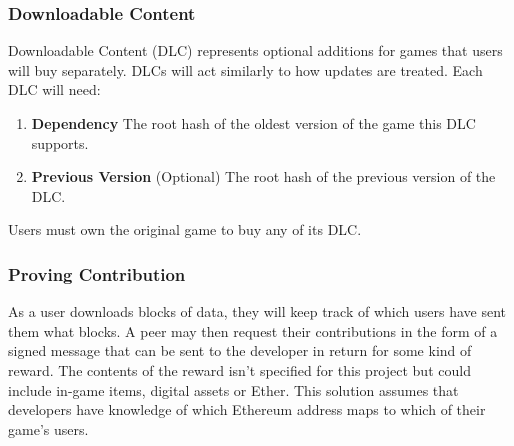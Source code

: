 \subsubsection*{Downloadable Content}

Downloadable Content (DLC)  represents optional additions for games that users will buy separately. DLCs will act similarly to how updates are treated. Each DLC will need:

\begin{enumerate}
  \item \textbf{Dependency} The root hash of the oldest version of the game this DLC supports.
  \item \textbf{Previous Version} (Optional) The root hash of the previous version of the DLC.
\end{enumerate}

\newparagraph
Users must own the original game to buy any of its DLC. 

\subsubsection*{Proving Contribution}

As a user downloads blocks of data, they will keep track of which users have sent them what blocks. A peer may then request their contributions in the form of a signed message that can be sent to the developer  in return for some kind of reward. The contents of the reward isn't specified for this project but could include in-game items, digital assets or Ether. This solution assumes that developers have knowledge of which Ethereum address maps to which of their game's users.